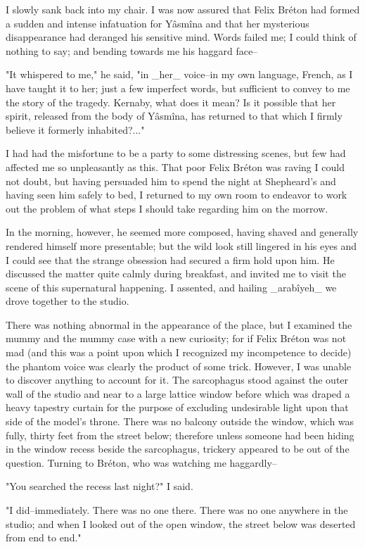 I slowly sank back into my chair. I was now assured that Felix Bréton
had formed a sudden and intense infatuation for Yâsmîna and that her
mysterious disappearance had deranged his sensitive mind. Words failed
me; I could think of nothing to say; and bending towards me his
haggard face--

"It whispered to me," he said, "in _her_ voice--in my own language,
French, as I have taught it to her; just a few imperfect words, but
sufficient to convey to me the story of the tragedy. Kernaby, what
does it mean? Is it possible that her spirit, released from the body
of Yâsmîna, has returned to that which I firmly believe it formerly
inhabited?..."

I had had the misfortune to be a party to some distressing scenes, but
few had affected me so unpleasantly as this. That poor Felix Bréton
was raving I could not doubt, but having persuaded him to spend the
night at Shepheard's and having seen him safely to bed, I returned to
my own room to endeavor to work out the problem of what steps I should
take regarding him on the morrow.

In the morning, however, he seemed more composed, having shaved and
generally rendered himself more presentable; but the wild look still
lingered in his eyes and I could see that the strange obsession had
secured a firm hold upon him. He discussed the matter quite calmly
during breakfast, and invited me to visit the scene of this
supernatural happening. I assented, and hailing _arabîyeh_ we drove
together to the studio.

There was nothing abnormal in the appearance of the place, but I
examined the mummy and the mummy case with a new curiosity; for if
Felix Bréton was not mad (and this was a point upon which I recognized
my incompetence to decide) the phantom voice was clearly the product
of some trick. However, I was unable to discover anything to account
for it. The sarcophagus stood against the outer wall of the studio and
near to a large lattice window before which was draped a heavy
tapestry curtain for the purpose of excluding undesirable light upon
that side of the model's throne. There was no balcony outside the
window, which was fully, thirty feet from the street below; therefore
unless someone had been hiding in the window recess beside the
sarcophagus, trickery appeared to be out of the question. Turning to
Bréton, who was watching me haggardly--

"You searched the recess last night?" I said.

"I did--immediately. There was no one there. There was no one anywhere
in the studio; and when I looked out of the open window, the street
below was deserted from end to end."

